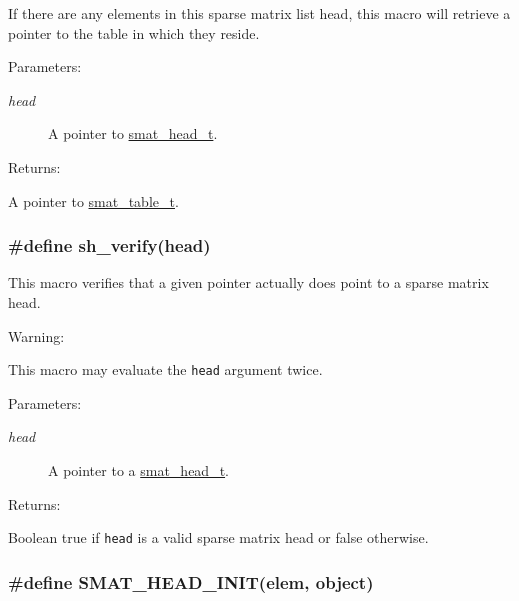 If there are any elements in this sparse matrix list head, this macro will retrieve a pointer to the table in which they reside.\begin{Desc}
\item[Parameters: ]\par
\begin{description}
\item[{\em 
head}]A pointer to \hyperlink{group__dbprim__smat_a1}{smat\_\-head\_\-t}.\end{description}
\end{Desc}
\begin{Desc}
\item[Returns: ]\par
A pointer to \hyperlink{group__dbprim__smat_a0}{smat\_\-table\_\-t}. \end{Desc}
\hypertarget{group__dbprim__smat_a30}{
\subsubsection[sh\_\-verify]{\setlength{\rightskip}{0pt plus 5cm}\#define sh\_\-verify(head)}}
\label{group__dbprim__smat_a30}


This macro verifies that a given pointer actually does point to a sparse matrix head.

\begin{Desc}
\item[Warning: ]\par
This macro may evaluate the {\tt head} argument twice.\end{Desc}
\begin{Desc}
\item[Parameters: ]\par
\begin{description}
\item[{\em 
head}]A pointer to a \hyperlink{group__dbprim__smat_a1}{smat\_\-head\_\-t}.\end{description}
\end{Desc}
\begin{Desc}
\item[Returns: ]\par
Boolean true if {\tt head} is a valid sparse matrix head or false otherwise. \end{Desc}
\hypertarget{group__dbprim__smat_a29}{
\subsubsection[SMAT\_\-HEAD\_\-INIT]{\setlength{\rightskip}{0pt plus 5cm}\#define SMAT\_\-HEAD\_\-INIT(elem, object)}}
\label{group__dbprim__smat_a29}



